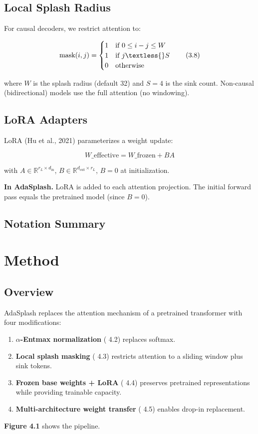 \subsection{Local Splash Radius}

For causal decoders, we restrict attention to:

\[
\text{mask}(i, j) = \begin{cases}
1 & \text{if } 0 \leq i - j \leq W \\
1 & \text{if } j \textless{} S \\
0 & \text{otherwise}
\end{cases}
\tag{3.8}
\]

where $W$ is the splash radius (default 32) and $S = 4$ is the sink count. 
Non-causal (bidirectional) models use the full attention (no windowing).

\subsection{LoRA Adapters}

LoRA (Hu et al., 2021) parameterizes a weight update:

\[
W\_\text{effective} = W\_\text{frozen} + B A
\tag{3.9}
\]

with $A \in \mathbb{R}^{r_L \times d_\text{in}}$, $B \in \mathbb{R}^{d_\text{out} \times r_L}$, 
$B = 0$ at initialization.

\textbf{In AdaSplash.} LoRA is added to each attention projection. The 
initial forward pass equals the pretrained model (since $B = 0$).

\subsection{Notation Summary}



\section{Method}

\subsection{Overview}

AdaSplash replaces the attention mechanism of a pretrained transformer with 
four modifications:

\begin{enumerate}
\item \textbf{$\alpha$-Entmax normalization} ( 4.2) replaces softmax.
\item \textbf{Local splash masking} ( 4.3) restricts attention to a sliding window
  plus sink tokens.
\item \textbf{Frozen base weights + LoRA} ( 4.4) preserves pretrained representations
  while providing trainable capacity.
\item \textbf{Multi-architecture weight transfer} ( 4.5) enables drop-in replacement.

\end{enumerate}
\textbf{Figure 4.1} shows the pipeline.

